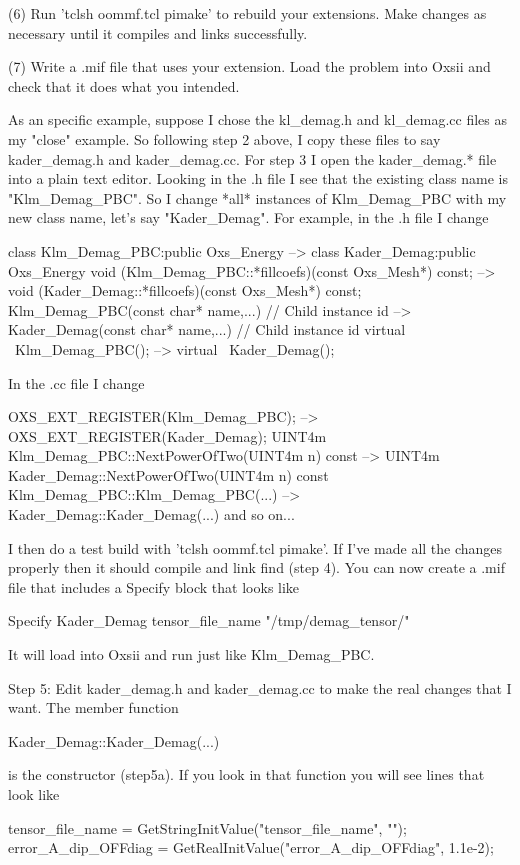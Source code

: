{(6) Run 'tclsh oommf.tcl pimake' to rebuild your extensions.  Make
    changes as necessary until it compiles and links successfully.

(7) Write a .mif file that uses your extension.  Load the problem into
    Oxsii and check that it does what you intended.

As an specific example, suppose I chose the kl_demag.h and kl_demag.cc
files as my "close" example.  So following step 2 above, I copy these
files to say kader_demag.h and kader_demag.cc.  For step 3 I open the
kader_demag.* file into a plain text editor.  Looking in the .h file I
see that the existing class name is "Klm_Demag_PBC".  So I change *all*
instances of Klm_Demag_PBC with my new class name, let's say
"Kader_Demag".  For example, in the .h file I change

 class Klm_Demag_PBC:public Oxs_Energy                    --> class Kader_Demag:public Oxs_Energy
 void (Klm_Demag_PBC::*fillcoefs)(const Oxs_Mesh*) const; --> void (Kader_Demag::*fillcoefs)(const Oxs_Mesh*) const;
 Klm_Demag_PBC(const char* name,...) // Child instance id --> Kader_Demag(const char* name,...) // Child instance id
 virtual ~Klm_Demag_PBC();                                --> virtual ~Kader_Demag();

In the .cc file I change

   OXS_EXT_REGISTER(Klm_Demag_PBC);                      --> OXS_EXT_REGISTER(Kader_Demag);
   UINT4m Klm_Demag_PBC::NextPowerOfTwo(UINT4m n) const  --> UINT4m Kader_Demag::NextPowerOfTwo(UINT4m n) const
   Klm_Demag_PBC::Klm_Demag_PBC(...)                     --> Kader_Demag::Kader_Demag(...)
   and so on...

I then do a test build with 'tclsh oommf.tcl pimake'.  If I've made all
the changes properly then it should compile and link find (step 4).  You
can now create a .mif file that includes a Specify block that looks like

   Specify Kader_Demag {
      tensor_file_name    "/tmp/demag_tensor/"
   }

It will load into Oxsii and run just like Klm_Demag_PBC.

Step 5: Edit kader_demag.h and kader_demag.cc to make the real changes
that I want.  The member function

    Kader_Demag::Kader_Demag(...)

is the constructor (step5a).  If you look in that function you will see
lines that look like

  tensor_file_name = GetStringInitValue("tensor_file_name", "");
  error_A_dip_OFFdiag = GetRealInitValue("error_A_dip_OFFdiag", 1.1e-2);

}
